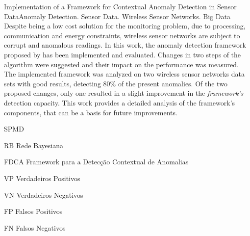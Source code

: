 \documentclass[cic,tc]{iiufrgs}
\begin{document}
\begin{englishabstract}{
Implementation of a Framework for Contextual Anomaly Detection in Sensor Data}{Anomaly Detection.  Sensor Data. Wireless Sensor Networks. Big Data}
	Despite being a low cost solution for the monitoring problem, due to processing, communication and energy constraints, wireless sensor networks are subject to corrupt and anomalous readings. In this work, the anomaly detection framework proposed by \cite{MasterMichaels2014} has been implemented and evaluated. Changes in two steps of the algorithm were suggested and their impact on the performance was measured. The implemented framework was analyzed on two wireless sensor networks data sets with good results, detecting 80\% of the present anomalies. Of the two proposed changes, only one resulted in a slight improvement in the \textit{framework's} detection capacity. This work provides a detailed analysis of the framework's components, that can be a basis for future improvements.
\end{englishabstract}

\listoffigures

\listoftables

\begin{listofabbrv}{SPMD}
    \item[RB] Rede Bayesiana
    \item[FDCA] Framework para a Detecção Contextual de Anomalias
    \item[VP] Verdadeiros Positivos
    \item[VN] Verdadeiros Negativos
    \item[FP] Falsos Positivos
    \item[FN] Falsos Negativos
\end{listofabbrv}


\tableofcontents
\end{document}
